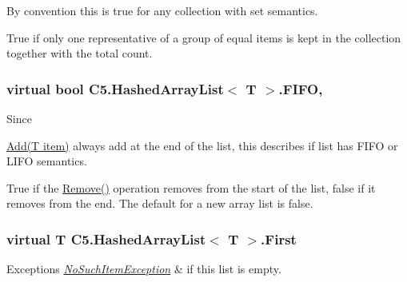 By convention this is true for any collection with set semantics. 

True if only one representative of a group of equal items is kept in the collection together with the total count.\hypertarget{class_c5_1_1_hashed_array_list_afc96d23115af14b75b10a1b9af9e844c}{}
\subsubsection[{F\+I\+F\+O}]{\setlength{\rightskip}{0pt plus 5cm}virtual bool {\bf C5.\+Hashed\+Array\+List}$<$ T $>$.F\+I\+F\+O\hspace{0.3cm}{\ttfamily [get]}, {\ttfamily [set]}}\label{class_c5_1_1_hashed_array_list_afc96d23115af14b75b10a1b9af9e844c}


Since 

{\ttfamily \hyperlink{class_c5_1_1_hashed_array_list_a4606087ab02e09f75ce6810b7a9d11a4}{Add(\+T item)}} always add at the end of the list, this describes if list has F\+I\+F\+O or L\+I\+F\+O semantics. 

True if the {\ttfamily \hyperlink{class_c5_1_1_hashed_array_list_a36ab8321ad505bf9780d39a41d419f31}{Remove()}} operation removes from the start of the list, false if it removes from the end. The default for a new array list is false.\hypertarget{class_c5_1_1_hashed_array_list_af6ac7881402fcbbbadadd1b1e2f22478}{}
\subsubsection[{First}]{\setlength{\rightskip}{0pt plus 5cm}virtual T {\bf C5.\+Hashed\+Array\+List}$<$ T $>$.First\hspace{0.3cm}{\ttfamily [get]}}\label{class_c5_1_1_hashed_array_list_af6ac7881402fcbbbadadd1b1e2f22478}





\begin{DoxyExceptions}{Exceptions}
{\em \hyperlink{class_c5_1_1_no_such_item_exception}{No\+Such\+Item\+Exception}} & if this list is empty.\\
\hline
\end{DoxyExceptions}


